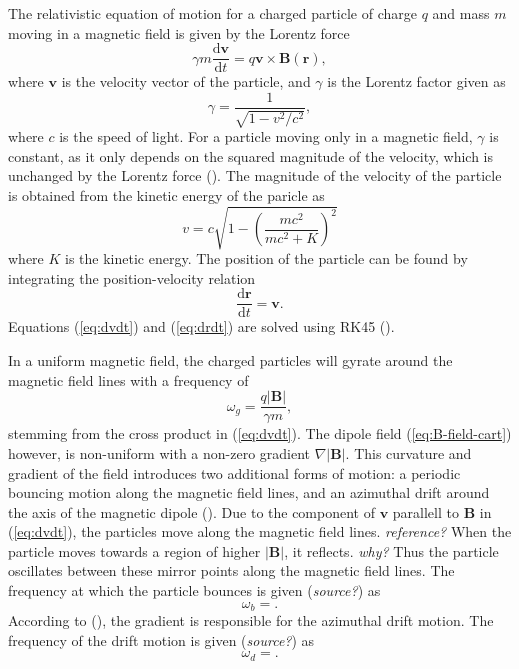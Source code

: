 The relativistic equation of motion for a charged particle of charge $q$ and mass $m$ moving in a magnetic field is given by the Lorentz force
\begin{equation}
    \gamma m \frac{\text{d}\bm{v}}{\text{d}t} = q\bm{v} \times \bm{B}(\bm{r}),
    \label{eq:dvdt}
\end{equation}
where $\bm{v}$ is the velocity vector of the particle, and $\gamma$ is the Lorentz factor given as
\begin{equation}
    \gamma = \frac{1}{\sqrt{1-v^2/c^2}},
\end{equation}
where $c$ is the speed of light. 
For a particle moving only in a magnetic field, $\gamma$ is constant, as it only depends on the squared magnitude of the velocity, which is unchanged by the Lorentz force (\cite{griffiths_2024}). 
The magnitude of the velocity of the particle is obtained from the kinetic energy of the paricle as
\begin{equation}
    v = c \sqrt{1-\left ( \frac{mc^2}{mc^2 + K}\right )^2}
    \label{eq:v}
\end{equation}
where $K$ is the kinetic energy. 
The position of the particle can be found by integrating the position-velocity relation
\begin{equation}
    \frac{\text{d}\bm{r}}{\text{d}t} = \bm{v}.
    \label{eq:drdt}
\end{equation}
Equations (\ref{eq:dvdt}) and (\ref{eq:drdt}) are solved using RK45 (\cite{DORMAND198019}). 

In a uniform magnetic field, the charged particles will gyrate around the magnetic field lines with a frequency of
\begin{equation}
    \omega_g = \frac{q|\bm{B}|}{\gamma m},
    \label{eq:omega-gyr}
\end{equation}
stemming from the cross product in (\ref{eq:dvdt}). 
The dipole field (\ref{eq:B-field-cart}) however, is non-uniform with a non-zero gradient $\nabla |\bm{B}|$. 
This curvature and gradient of the field introduces two additional forms of motion: a periodic bouncing motion along the magnetic field lines, and an azimuthal drift around the axis of the magnetic dipole (\cite{soni_2021}). 
Due to the component of $\bm{v}$ parallell to $\bm{B}$ in (\ref{eq:dvdt}), the particles move along the magnetic field lines. \textit{reference?}
When the particle moves towards a region of higher $|\bm{B}|$, it reflects. \textit{why?}
Thus the particle oscillates between these mirror points along the magnetic field lines.
The frequency at which the particle bounces is given (\textit{source?}) as
\begin{equation}
    \omega_b = .
\end{equation}
According to (\cite{soni_2021}), the gradient is responsible for the azimuthal drift motion. 
The frequency of the drift motion is given (\textit{source?}) as
\begin{equation}
    \omega_d = .
\end{equation}


